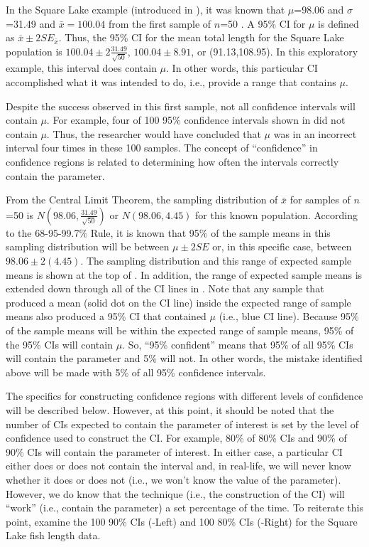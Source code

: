 \documentclass[10pt,openany]{book}\usepackage[]{graphicx}\usepackage[]{color}
\begin{document}
In the Square Lake example (introduced in ), it was known that $\mu$=98.06 and $\sigma$=31.49  and $\bar{x}=100.04$ from the first sample of $n$=50 . A 95\% CI for $\mu$ is defined as $\bar{x}\pm2SE_{\bar{x}}$. Thus, the 95\% CI for the mean total length for the Square Lake population is $100.04\pm2\frac{31.49}{\sqrt{50}}$, $100.04\pm8.91$, or (91.13,108.95).  In this exploratory example, this interval does contain $\mu$.  In other words, this particular CI accomplished what it was intended to do, i.e., provide a range that contains $\mu$.

Despite the success observed in this first sample, not all confidence intervals will contain $\mu$.  For example, four of 100 95\% confidence intervals shown in  did not contain $\mu$.  Thus, the researcher would have concluded that $\mu$ was in an incorrect interval four times in these 100 samples.  The concept of ``confidence'' in confidence regions is related to determining how often the intervals correctly contain the parameter.

From the Central Limit Theorem, the sampling distribution of $\bar{x}$ for samples of $n$=50 is $N(98.06,\frac{31.49}{\sqrt{50}})$ or $N(98.06,4.45)$ for this known population.  According to the 68-95-99.7\% Rule, it is known that 95\% of the sample means in this sampling distribution will be between $\mu\pm2SE$ or, in this specific case, between $98.06\pm2(4.45)$.  The sampling distribution and this range of expected sample means is shown at the top of .  In addition, the range of expected sample means is extended down through all of the CI lines in .  Note that any sample that produced a mean (solid dot on the CI line) inside the expected range of sample means also produced a 95\% CI that contained $\mu$ (i.e., blue CI line).  Because 95\% of the sample means will be within the expected range of sample means, 95\% of the 95\% CIs will contain $\mu$.  So, ``95\% confident'' means that 95\% of all 95\% CIs will contain the parameter and 5\% will not.  In other words, the mistake identified above will be made with 5\% of all 95\% confidence intervals.

The specifics for constructing confidence regions with different levels of confidence will be described below.  However, at this point, it should be noted that the number of CIs expected to contain the parameter of interest is set by the level of confidence used to construct the CI.  For example, 80\% of 80\% CIs and 90\% of 90\% CIs will contain the parameter of interest.  In either case, a particular CI either does or does not contain the interval and, in real-life, we will never know whether it does or does not (i.e., we won't know the value of the parameter).  However, we do know that the technique (i.e., the construction of the CI) will ``work'' (i.e., contain the parameter) a set percentage of the time.  To reiterate this point, examine the 100 90\% CIs (-Left) and 100 80\% CIs (-Right) for the Square Lake fish length data.
\end{document}

